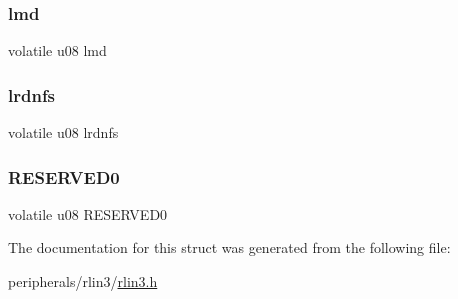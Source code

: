 \mbox{\label{structrlin3__lmd_a758e51afbea8c42173bad9d951e124bb}} 
\subsubsection{\texorpdfstring{lmd}{lmd}}
{\footnotesize\ttfamily volatile u08 lmd}

\mbox{\label{structrlin3__lmd_a60ae11c6a09d11af809041fe18f941fd}} 
\subsubsection{\texorpdfstring{lrdnfs}{lrdnfs}}
{\footnotesize\ttfamily volatile u08 lrdnfs}

\mbox{\label{structrlin3__lmd_a59c0b30ccfb89f1b34e9682741859abd}} 
\subsubsection{\texorpdfstring{R\+E\+S\+E\+R\+V\+E\+D0}{RESERVED0}}
{\footnotesize\ttfamily volatile u08 R\+E\+S\+E\+R\+V\+E\+D0}



The documentation for this struct was generated from the following file\+:\begin{DoxyCompactItemize}
\item 
peripherals/rlin3/\mbox{\hyperlink{rlin3_8h}{rlin3.\+h}}\end{DoxyCompactItemize}
